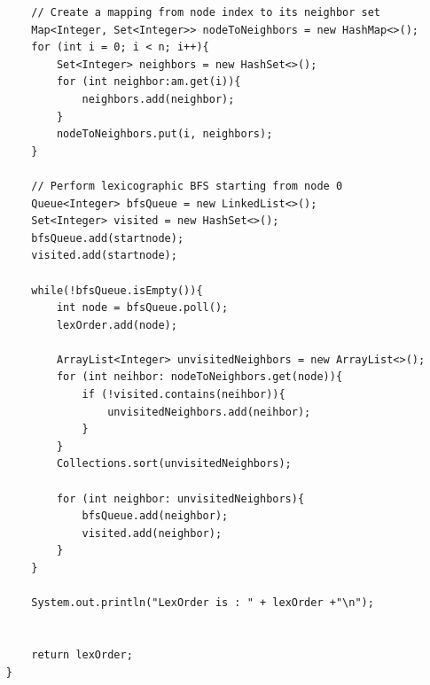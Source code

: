 \documentclass{article}
\begin{document}
\begin{enumerate}
\begin{verbatim}
        // Create a mapping from node index to its neighbor set
        Map<Integer, Set<Integer>> nodeToNeighbors = new HashMap<>();
        for (int i = 0; i < n; i++){
            Set<Integer> neighbors = new HashSet<>();
            for (int neighbor:am.get(i)){
                neighbors.add(neighbor);
            }
            nodeToNeighbors.put(i, neighbors);
        }

        // Perform lexicographic BFS starting from node 0
        Queue<Integer> bfsQueue = new LinkedList<>();
        Set<Integer> visited = new HashSet<>();
        bfsQueue.add(startnode);
        visited.add(startnode);

        while(!bfsQueue.isEmpty()){
            int node = bfsQueue.poll();
            lexOrder.add(node);

            ArrayList<Integer> unvisitedNeighbors = new ArrayList<>();
            for (int neihbor: nodeToNeighbors.get(node)){
                if (!visited.contains(neihbor)){
                    unvisitedNeighbors.add(neihbor);
                }
            }
            Collections.sort(unvisitedNeighbors);

            for (int neighbor: unvisitedNeighbors){
                bfsQueue.add(neighbor);
                visited.add(neighbor);
            }
        }

        System.out.println("LexOrder is : " + lexOrder +"\n");


        return lexOrder;
    }
    

\end{verbatim}
\end{enumerate}
\end{document}
